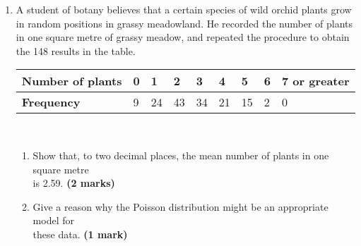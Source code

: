 \documentclass[fleqn]{article}
\begin{document}
\begin{enumerate}
    \newpage
    \item A student of botany believes that a certain species of wild orchid plants grow in random positions in grassy meadowland. He recorded the number of plants in one square metre of grassy meadow, and repeated the procedure to obtain the 148 results in the table.\vspace{2mm}\\
        \begin{tabularx}{0.8\textwidth}{|X|*7{P{9mm}|}P{20mm}|}
            \hline
            \textbf{Number of plants} & 0  & 1  & 2  & 3  & 4  & 5  & 6 & 7 or greater   \\\hline
            \textbf{Frequency}        & 9  & 24 & 43 & 34 & 21 & 15 & 2 & 0              \\\hline
        \end{tabularx}\vspace{3mm}\\
        \begin{enumerate}[label=\bfseries \alph*\space ]
            \item Show that, to two decimal places, the mean number of plants in one square metre \\is 2.59. \hfill\textbf{(2 marks)}
            \item Give a reason why the Poisson distribution might be an appropriate model for\\ these data. \hfill\textbf{(1 mark)}
        \end{enumerate}
    

\end{enumerate}
\end{document}
